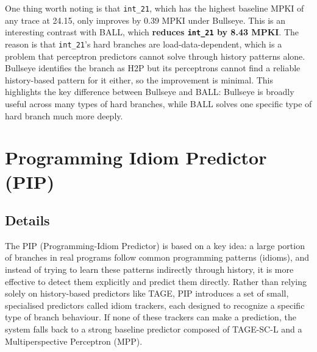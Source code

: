 \documentclass[11pt,a4paper]{article}
\begin{document}
One thing worth noting is that \texttt{int\_21}, which has the highest baseline 
MPKI of any trace at 24.15, only improves by 0.39 MPKI under Bullseye. This is
an interesting contrast with BALL, which \textbf{reduces \texttt{int\_21} by 8.43 MPKI}.
The reason is that \texttt{int\_21}'s hard branches are load-data-dependent, 
which is a problem that perceptron predictors cannot solve through history 
patterns alone. Bullseye identifies the branch as H2P but its perceptrons 
cannot find a reliable history-based pattern for it either, so the improvement 
is minimal. This highlights the key difference between Bullseye and BALL: 
Bullseye is broadly useful across many types of hard branches, while BALL 
solves one specific type of hard branch much more deeply.


\section{Programming Idiom Predictor (PIP)}
\subsection{Details}
The PIP (Programming-Idiom Predictor) is based on a key idea: a large portion of branches in real programs follow common programming patterns (idioms), and instead of trying to learn these patterns indirectly through history, it is more effective to detect them explicitly and predict them directly.
Rather than relying solely on history-based predictors like TAGE, PIP introduces a set of small, specialised predictors called idiom trackers, each designed to recognize a specific type of branch behaviour.
If none of these trackers can make a prediction, the system falls back to a strong baseline predictor composed of TAGE-SC-L and a Multiperspective Perceptron (MPP).
\end{document}
